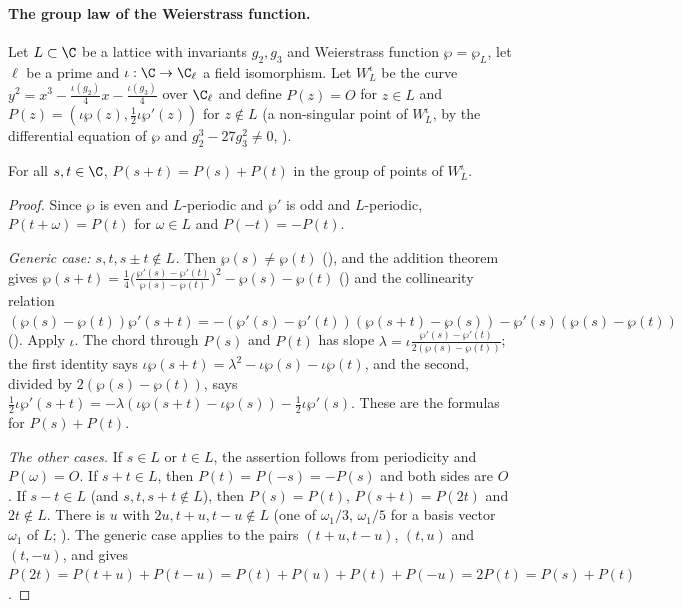 \paragraph{The group law of the Weierstrass function.}
Let $L\subset\C$ be a lattice with invariants $g_2,g_3$ and Weierstrass function $\wp=\wp_L$, let $\ell$ be a prime and
$\iota:\C\to\C_\ell$ a field isomorphism. Let $W^\iota_L$ be the curve $y^2=x^3-\frac{\iota(g_2)}4x-\frac{\iota(g_3)}4$ over
$\C_\ell$ and define $P(z)=O$ for $z\in L$ and $P(z)=(\iota\wp(z),\frac12\iota\wp'(z))$ for $z\notin L$ (a non-singular point of
$W^\iota_L$, by the differential equation of $\wp$ and $g_2^3-27g_3^2\ne0$,
).

\begin{lemma}\label{pf:rows:ptofadd}
For all $s,t\in\C$, $P(s+t)=P(s)+P(t)$ in the group of points of $W^\iota_L$.
\end{lemma}

\begin{proof}
Since $\wp$ is even and $L$-periodic and $\wp'$ is odd and $L$-periodic, $P(t+\omega)=P(t)$ for $\omega\in L$ and
$P(-t)=-P(t)$.

\emph{Generic case: $s,t,s\pm t\notin L$.} Then $\wp(s)\ne\wp(t)$ (), and the
addition theorem gives
$\wp(s+t)=\frac14\bigl(\frac{\wp'(s)-\wp'(t)}{\wp(s)-\wp(t)}\bigr)^2-\wp(s)-\wp(t)$
() and the collinearity relation
$(\wp(s)-\wp(t))\wp'(s+t)=-(\wp'(s)-\wp'(t))(\wp(s+t)-\wp(s))-\wp'(s)(\wp(s)-\wp(t))$
(). Apply $\iota$. The chord through $P(s)$ and $P(t)$ has slope
$\lambda=\iota\frac{\wp'(s)-\wp'(t)}{2(\wp(s)-\wp(t))}$; the first identity says $\iota\wp(s+t)=\lambda^2-\iota\wp(s)-\iota\wp(t)$, and
the second, divided by $2(\wp(s)-\wp(t))$, says $\frac12\iota\wp'(s+t)=-\lambda(\iota\wp(s+t)-\iota\wp(s))-\frac12\iota\wp'(s)$. These are
the formulas for $P(s)+P(t)$.

\emph{The other cases.} If $s\in L$ or $t\in L$, the assertion follows from periodicity and $P(\omega)=O$. If $s+t\in L$, then
$P(t)=P(-s)=-P(s)$ and both sides are $O$. If $s-t\in L$ (and $s,t,s+t\notin L$), then $P(s)=P(t)$, $P(s+t)=P(2t)$ and
$2t\notin L$. There is $u$ with $2u,t+u,t-u\notin L$ (one of $\omega_1/3$, $\omega_1/5$ for a basis vector $\omega_1$ of $L$;
). The generic case applies to
the pairs $(t+u,t-u)$, $(t,u)$ and $(t,-u)$, and gives
$P(2t)=P(t+u)+P(t-u)=P(t)+P(u)+P(t)+P(-u)=2P(t)=P(s)+P(t)$.
\end{proof}

